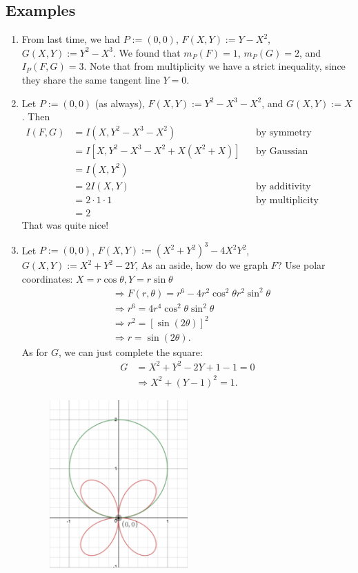 \documentclass[12pt]{article}
\theoremstyle{definition}
\begin{document}
\subsection{Examples}
\begin{enumerate}
    \item From last time, we had $P:=(0,0)$, $F(X,Y):=Y-X^2$, $G(X,Y):=Y^2-X^3$. We found that $m_P(F)=1$, $m_P(G)=2$, and $I_P(F,G)=3$. Note that from multiplicity we have a strict inequality, since they share the same tangent line $Y=0$.
    \item Let $P:=(0,0)$ (as always), $F(X,Y):=Y^2-X^3-X^2$, and $G(X,Y):=X$.
    Then
    \begin{align*}
        I(F,G)&=I(X,Y^2-X^3-X^2)&&\text{by symmetry}\\
        &=I[X,Y^2-X^3-X^2+X(X^2+X)]&&\text{by Gaussian reduction}\\
        &=I(X,Y^2)\\
        &=2I(X,Y)&&\text{by additivity}\\
        &=2\cdot1\cdot1&&\text{by multiplicity}\\
        &=\boxed{2}
    \end{align*}
    That was quite nice!
    \item Let $P:=(0,0)$, $F(X,Y):=(X^2+Y^2)^3-4X^2Y^2$, $G(X,Y):=X^2+Y^2-2Y$, As an aside, how do we graph $F$? Use polar coordinates: $X=r\cos\theta,Y=r\sin\theta$
    \begin{align*}
        &\Rightarrow F(r,\theta)=r^6-4r^2\cos^2\theta r^2\sin^2\theta\\
        &\Rightarrow r^6=4r^4\cos^2\theta\sin^2\theta\\
        &\Rightarrow r^2=[\sin(2\theta)]^2\\
        &\Rightarrow r=\sin(2\theta).
    \end{align*}
    As for $G$, we can just complete the square:
    \begin{align*}
        G&=X^2+Y^2-2Y+1-1=0\\
        &\Rightarrow X^2+(Y-1)^2=1.
    \end{align*}
    \begin{figure}[H]
        \centering
        \includegraphics[width=0.5\textwidth]{25.png}

\end{figure}
\end{enumerate}
\end{document}
